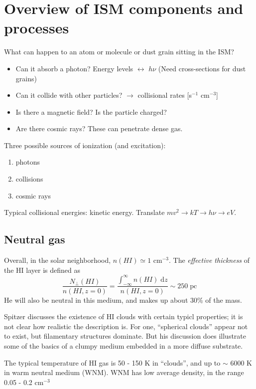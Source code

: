 \documentclass[11pt]{article}
\newcommand{\mar}[1]{\hspace{0pt}\marginpar{-\textcolor{black}{#1}-}}
\let\oldsection\section
\renewcommand\section{\clearpage\oldsection}
\begin{document}
\setlength{\parskip}{0ex}
\tableofcontents\newpage
\setlength{\parskip}{2ex}
\reversemarginpar

\section{Overview of ISM components and processes}
\mar{6}What can happen to an atom or molecule or dust grain sitting in the ISM?
\begin{itemize}
    \item Can it absorb a photon? Energy levels $\leftrightarrow$ $h\nu$
        (Need cross-sections for dust grains)
    \item Can it collide with other particles? $\rightarrow$ collisional
        rates [s$^{-1}$ cm$^{-3}$]
    \item Is there a magnetic field? Is the particle charged?
    \item Are there cosmic rays? These can penetrate dense gas.
\end{itemize}
Three possible sources of ionization (and excitation):
\begin{enumerate}
    \item photons
    \item collisions
    \item cosmic rays
\end{enumerate}
Typical collisional energies: kinetic energy.
Translate $mv^{2} \rightarrow kT \rightarrow h\nu \rightarrow eV$.

\subsection{Neutral gas}
\mar{7}Overall, in the solar neighborhood, $n(HI) \simeq 1$ cm$^{-3}$.
The \textit{effective thickness} of the HI layer is defined as
\[
    \frac{N_{\perp}(HI)}{n(HI, z=0)}
    = \frac{\int_{-\infty}^{\infty} n(HI)\;\mathrm{d}z}{n(HI, z=0)}
    \sim 250 \;\mathrm{pc}
    \]
He will also be neutral in this medium, and makes up about 30\% of the mass.

Spitzer discusses the existence of HI clouds with certain typicl properties;
it is not clear how realistic the description is. For one, ``spherical clouds''
appear not to exist, but filamentary structures dominate. But his discussion
does illustrate some of the basics of a clumpy medium embedded in a more diffuse
substrate.

The typical temperature of HI gas is 50 - 150 K in ``clouds'', and up to
$\sim$ 6000 K in warm neutral medium (WNM). WNM has low average density,
in the range 0.05 - 0.2 cm$^{-3}$
\end{document}
